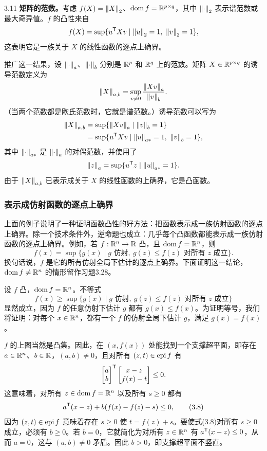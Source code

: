 \begin{origexample}{3.11}
\textbf{矩阵的范数。}考虑 $f(X)=\left\lVert X\right\rVert_2$、$\operatorname{dom} f=\mathbb R^{p\times q}$，其中 $\left\lVert \cdot\right\rVert_2$ 表示谱范数或最大奇异值。$f$ 的凸性来自
\[f(X)=\sup\{u^\mathsf T Xv\mid\left\lVert u\right\rVert_2=1,\ \left\lVert v\right\rVert_2=1\},\]
这表明它是一族关于 $X$ 的线性函数的逐点上确界。

推广这一结果，设 $\left\lVert \cdot\right\rVert_a$、$\left\lVert \cdot\right\rVert_b$ 分别是 $\mathbb R^p$ 和 $\mathbb R^q$ 上的范数。矩阵 $X\in\mathbb R^{p\times q}$ 的诱导范数定义为
\[\left\lVert X\right\rVert_{a,b}=\sup_{v\ne0}\frac{\left\lVert Xv\right\rVert_a}{\left\lVert v\right\rVert_b}.\]
（当两个范数都是欧氏范数时，它就是谱范数。）诱导范数可以写为
\[
\begin{aligned}
 \left\lVert X\right\rVert_{a,b}&=\sup\{\left\lVert Xv\right\rVert_a\mid\left\lVert v\right\rVert_b=1\}\\
 &=\sup\{u^\mathsf T Xv\mid\left\lVert u\right\rVert_{a*}=1,\ \left\lVert v\right\rVert_b=1\},
\end{aligned}
\]
其中 $\left\lVert \cdot\right\rVert_{a*}$ 是 $\left\lVert \cdot\right\rVert_a$ 的对偶范数，并使用了
\[\left\lVert z\right\rVert_a=\sup\{u^\mathsf T z\mid\left\lVert u\right\rVert_{a*}=1\}.\]
由于 $\left\lVert X\right\rVert_{a,b}$ 已表示成关于 $X$ 的线性函数的上确界，它是凸函数。
\end{origexample}
\subsubsection*{表示成仿射函数的逐点上确界}
上面的例子说明了一种证明函数凸性的好方法：把函数表示成一族仿射函数的逐点上确界。除一个技术条件外，逆命题也成立：几乎每个凸函数都能表示成一族仿射函数的逐点上确界。例如，若 $f:\mathbb R^n\to\mathbb R$ 凸，且 $\operatorname{dom} f=\mathbb R^n$，则
\[f(x)=\sup\{g(x)\mid g\text{ 仿射},\ g(z)\leq f(z)\text{ 对所有 }z\text{ 成立}\}.\]
换句话说，$f$ 是它的所有仿射全局下估计的逐点上确界。下面证明这一结论，$\operatorname{dom} f\ne\mathbb R^n$ 的情形留作习题3.28。

设 $f$ 凸，$\operatorname{dom} f=\mathbb R^n$。不等式
\[f(x)\geq\sup\{g(x)\mid g\text{ 仿射},\ g(z)\leq f(z)\text{ 对所有 }z\text{ 成立}\}\]
显然成立，因为 $f$ 的任意仿射下估计 $g$ 都有 $g(x)\leq f(x)$。为证明等号，我们将证明：对每个 $x\in\mathbb R^n$，都有一个 $f$ 的仿射全局下估计 $g$，满足 $g(x)=f(x)$。

$f$ 的上图当然是凸集。因此，在 $(x,f(x))$ 处能找到一个支撑超平面，即存在 $a\in\mathbb R^n$、$b\in\mathbb R$，$(a,b)\ne0$，且对所有 $(z,t)\in\operatorname{epi} f$ 有
\[\begin{bmatrix}a\\b\end{bmatrix}^{\mathsf T}
 \begin{bmatrix}x-z\\f(x)-t\end{bmatrix}\leq0.\]
这意味着，对所有 $z\in\operatorname{dom} f=\mathbb R^n$ 以及所有 $s\geq0$ 都有
\begin{equation}a^\mathsf T(x-z)+b(f(x)-f(z)-s)\leq0,\tag{3.8}\end{equation}
因为 $(z,t)\in\operatorname{epi} f$ 意味着存在 $s\geq0$ 使 $t=f(z)+s$。要使式(3.8)对所有 $s\geq0$ 成立，必须有 $b\geq0$。若 $b=0$，它就简化为对所有 $z\in\mathbb R^n$ 有 $a^\mathsf T(x-z)\leq0$，从而 $a=0$，这与 $(a,b)\ne0$ 矛盾。因此 $b>0$，即支撑超平面不竖直。

